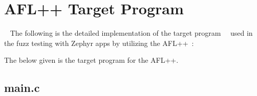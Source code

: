 \vspace{21.5pt}
\clearpage
\chapter{AFL++ Target Program}~\label{appx:first}
The following is the detailed implementation of the
target program~\cite{FuzzingE54:online}~\cite{zephyrsa35:online} used in
the fuzz testing with Zephyr apps by utilizing the AFL++~\cite{257204}:

The below given is the target program for the AFL++.
\section*{main.c}

